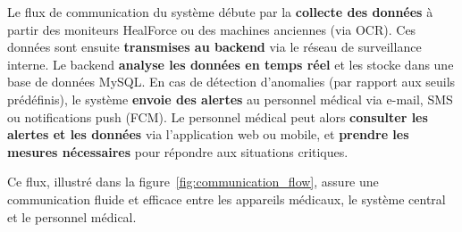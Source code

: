 Le flux de communication du système débute par la \textbf{collecte des données} à partir des moniteurs HealForce ou des machines anciennes (via OCR). Ces données sont ensuite \textbf{transmises au backend} via le réseau de surveillance interne. Le backend \textbf{analyse les données en temps réel} et les stocke dans une base de données MySQL. En cas de détection d’anomalies (par rapport aux seuils prédéfinis), le système \textbf{envoie des alertes} au personnel médical via e-mail, SMS ou notifications push (FCM). Le personnel médical peut alors \textbf{consulter les alertes et les données} via l’application web ou mobile, et \textbf{prendre les mesures nécessaires} pour répondre aux situations critiques.

Ce flux, illustré dans la figure~\ref{fig:communication_flow}, assure une communication fluide et efficace entre les appareils médicaux, le système central et le personnel médical.
